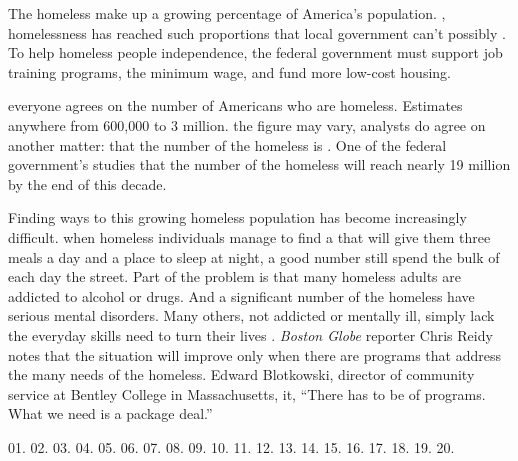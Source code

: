 
\qquad The homeless make up a growing percentage of America's population. \underline{\quad}, homelessness has reached such proportions that local government can't possibly \underline{\quad}. To help homeless people \underline{\quad} independence, the federal government must support job training programs, \underline{\quad} the minimum wage, and fund more low-cost housing.

\qquad \underline{\quad} everyone agrees on the number of Americans who are homeless. Estimates \underline{\quad} anywhere from 600,000 to 3 million. \underline{\quad} the figure may vary, analysts do agree on another matter: that the number of the homeless is \underline{\quad}. One of the federal government's studies \underline{\quad} that the number of the homeless will reach nearly 19 million by the end of this decade.

\qquad Finding ways to \underline{\quad} this growing homeless population has become increasingly difficult. \underline{\quad} when homeless individuals manage to find a \underline{\quad} that will give them three meals a day and a place to sleep at night, a good number still spend the bulk of each day \underline{\quad} the street. Part of the problem is that many homeless adults are addicted to alcohol or drugs. And a significant number of the homeless have serious mental disorders. Many others, \underline{\quad} not addicted or mentally ill, simply lack the everyday \underline{\quad} skills need to turn their lives \underline{\quad}. \emph{Boston Globe} reporter Chris Reidy notes that the situation will improve only when there are \underline{\quad} programs that address the many needs of the homeless. \underline{\quad} Edward Blotkowski, director of community service at Bentley College in Massachusetts, \underline{\quad} it, ``There has to be \underline{\quad} of programs. What we need is a package deal.''

\vspace{6pt}

01. 
02. 
03. 
04. 
05. 
06. 
07. 
08. 
09. 
10. 
11. 
12. 
13. 
14. 
15. 
16. 
17. 
18. 
19. 
20. 